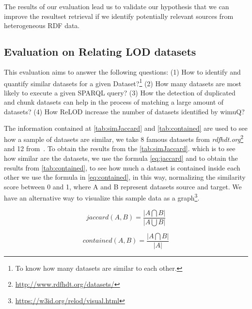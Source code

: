 \documentclass[sw]{iosart2x}
\begin{document}
The results of our evaluation lead us to validate our hypothesis that we can improve the resultset retrieval if we identify potentially relevant sources from heterogeneous RDF data.

\subsection{Evaluation on Relating LOD datasets} \label{sec:relod_eval}
This evaluation aims to answer the following questions: (1) How to identify and quantify similar datasets for a given Dataset?\footnote{To know how many datasets are similar to each other.} (2) How many datasets are most likely to execute a given SPARQL query? (3) How the detection of duplicated and chunk datasets can help in the process of matching a large amount of datasets? (4) How ReLOD increase the number of datasets identified by wimuQ?


The information contained at \cref{tab:simJaccard} and \cref{tab:contained} are used to see how a sample of datasets are similar, we take 8 famous datasets from \emph{rdfhdt.org}\footnote{\url{http://www.rdfhdt.org/datasets/}} and 12 from~\cite{10.1145/3308560.3317075}. To obtain the results from the \cref{tab:simJaccard}. which is to see how similar are the datasets, we use the formula \cref{eq:jaccard} and to obtain the results from \cref{tab:contained}, to see how much a dataset is contained inside each other we use the formula in \cref{eq:contained}, in this way, normalizing the similarity score between 0 and 1, where A and B represent datasets source and target. We have an alternative way to visualize this sample data as a graph\footnote{\url{https://w3id.org/relod/visual.html}}.

\begin{equation} \label{eq:jaccard}
    jaccard(A, B) = \frac{|A \bigcap B|}{ |A\bigcup B|}
\end{equation}

\begin{equation}\label{eq:contained}
    contained(A, B) = \frac{|A \bigcap B|}{|A|}
\end{equation}
\end{document}
